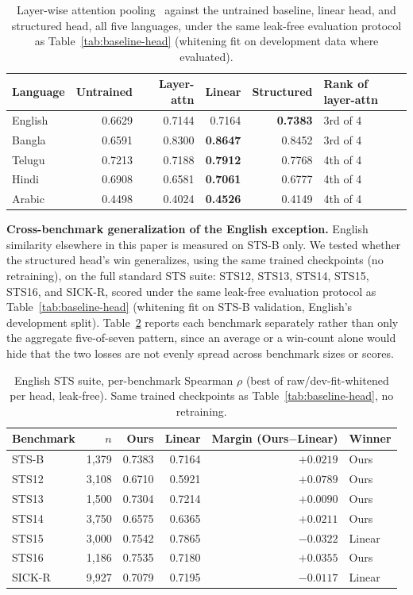 \documentclass[manuscript]{acmart}
\begin{document}
\begin{table}[h]
\caption{Layer-wise attention pooling~\citep{oh2022dontjudge} against the untrained baseline, linear head, and structured head, all five languages, under the same leak-free evaluation protocol as Table~\ref{tab:baseline-head} (whitening fit on development data where evaluated).}
\label{tab:layer-attn}
\begin{tabular}{@{}lrrrrl@{}}
\toprule
Language & Untrained & Layer-attn & Linear & Structured & Rank of layer-attn \\
\midrule
English & 0.6629 & 0.7144 & 0.7164 & \textbf{0.7383} & 3rd of 4 \\
Bangla  & 0.6591 & 0.8300 & \textbf{0.8647} & 0.8452 & 3rd of 4 \\
Telugu  & 0.7213 & 0.7188 & \textbf{0.7912} & 0.7768 & 4th of 4 \\
Hindi   & 0.6908 & 0.6581 & \textbf{0.7061} & 0.6777 & 4th of 4 \\
Arabic  & 0.4498 & 0.4024 & \textbf{0.4526} & 0.4149 & 4th of 4 \\
\bottomrule
\end{tabular}
\end{table}

\textbf{Cross-benchmark generalization of the English exception.} English similarity elsewhere in this paper is measured on STS-B only. We tested whether the structured head's win generalizes, using the same trained checkpoints (no retraining), on the full standard STS suite: STS12, STS13, STS14, STS15, STS16, and SICK-R, scored under the same leak-free evaluation protocol as Table~\ref{tab:baseline-head} (whitening fit on STS-B validation, English's development split). Table~\ref{tab:sts-suite} reports each benchmark separately rather than only the aggregate five-of-seven pattern, since an average or a win-count alone would hide that the two losses are not evenly spread across benchmark sizes or scores.

\begin{table}[h]
\caption{English STS suite, per-benchmark Spearman $\rho$ (best of raw/dev-fit-whitened per head, leak-free). Same trained checkpoints as Table~\ref{tab:baseline-head}, no retraining.}
\label{tab:sts-suite}
\begin{tabular}{@{}lrrrrl@{}}
\toprule
Benchmark & $n$ & Ours & Linear & Margin (Ours$-$Linear) & Winner \\
\midrule
STS-B  & 1{,}379 & 0.7383 & 0.7164 & $+0.0219$ & Ours \\
STS12  & 3{,}108 & 0.6710 & 0.5921 & $+0.0789$ & Ours \\
STS13  & 1{,}500 & 0.7304 & 0.7214 & $+0.0090$ & Ours \\
STS14  & 3{,}750 & 0.6575 & 0.6365 & $+0.0211$ & Ours \\
STS15  & 3{,}000 & 0.7542 & 0.7865 & $-0.0322$ & Linear \\
STS16  & 1{,}186 & 0.7535 & 0.7180 & $+0.0355$ & Ours \\
SICK-R & 9{,}927 & 0.7079 & 0.7195 & $-0.0117$ & Linear \\
\bottomrule
\end{tabular}
\end{table}
\end{document}

